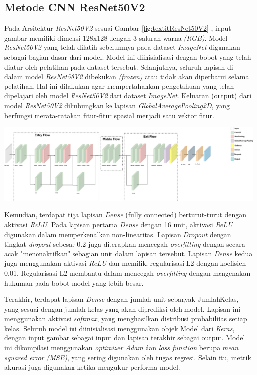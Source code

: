 \subsection{Metode CNN ResNet50V2}
Pada Arsitektur \textit{ResNet50V2} sesuai Gambar \ref{fig:textitResNet50V2} , input gambar memiliki dimensi 128x128 dengan 3 saluran warna \textit{(RGB)}. Model \textit{ResNet50V2} yang telah dilatih sebelumnya pada dataset \textit{ImageNet} digunakan sebagai bagian dasar dari model. Model ini diinisialisasi dengan bobot yang telah diatur oleh pelatihan pada dataset tersebut. Selanjutnya, seluruh lapisan di dalam model \textit{ResNet50V2} dibekukan \textit{(frozen)} atau tidak akan diperbarui selama pelatihan. Hal ini dilakukan agar mempertahankan pengetahuan yang telah dipelajari oleh model \textit{ResNet50V2} dari dataset \textit{ImageNet}. Keluaran (output) dari model \textit{ResNet50V2} dihubungkan ke lapisan \textit{GlobalAveragePooling2D}, yang berfungsi merata-ratakan fitur-fitur spasial menjadi satu vektor fitur.
\begin{center}
	\includegraphics[width=1.1\linewidth]{gambar/bener/Arsitektur_ModelCNNResNet50v2_Modifikasi.png}
	\label{fig:textitResNet50V2}
\end{center}
Kemudian, terdapat tiga lapisan \textit{Dense} (fully connected) berturut-turut dengan aktivasi \textit{ReLU}. Pada lapisan pertama \textit{Dense} dengan 16 unit, aktivasi \textit{ReLU} digunakan dalam memperkenalkan non-linearitas. Lapisan \textit{Dropout} dengan tingkat \textit{dropout} sebesar 0.2 juga diterapkan mencegah \textit{overfitting} dengan secara acak "menonaktifkan" sebagian unit dalam lapisan tersebut. Lapisan \textit{Dense} kedua juga menggunakan aktivasi \textit{ReLU} dan memiliki regularisasi L2 dengan koefisien 0.01. Regularisasi L2 membantu dalam mencegah \textit{overfitting} dengan mengenakan hukuman pada bobot model yang lebih besar.

Terakhir, terdapat lapisan \textit{Dense} dengan jumlah unit sebanyak JumlahKelas, yang sesuai dengan jumlah kelas yang akan diprediksi oleh model. Lapisan ini menggunakan aktivasi \textit{softmax}, yang menghasilkan distribusi probabilitas setiap kelas. Seluruh model ini diinisialisasi menggunakan objek Model dari \textit{Keras}, dengan input gambar sebagai input dan lapisan terakhir sebagai output. Model ini dikompilasi menggunakan \textit{optimizer Adam} dan \textit{loss function} berupa\textit{ mean squared error (MSE)}, yang sering digunakan oleh tugas regresi. Selain itu, metrik akurasi juga digunakan ketika mengukur performa model.

